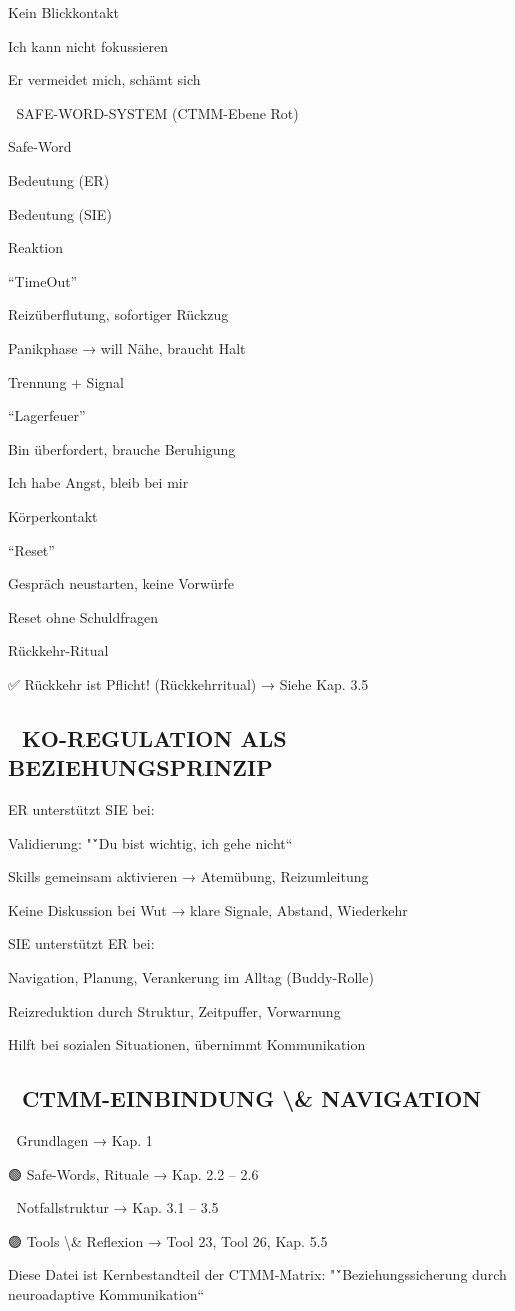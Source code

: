 Kein Blickkontakt

Ich kann nicht fokussieren

Er vermeidet mich, schämt sich

🔑 SAFE-WORD-SYSTEM (CTMM-Ebene Rot)

Safe-Word

Bedeutung (ER)

Bedeutung (SIE)

Reaktion

“TimeOut”

Reizüberflutung, sofortiger Rückzug

Panikphase → will Nähe, braucht Halt

Trennung + Signal

“Lagerfeuer”

Bin überfordert, brauche Beruhigung

Ich habe Angst, bleib bei mir

Körperkontakt

“Reset”

Gespräch neustarten, keine Vorwürfe

Reset ohne Schuldfragen

Rückkehr-Ritual

✅ Rückkehr ist Pflicht! (Rückkehrritual) → Siehe Kap. 3.5

\subsection{🤝 KO-REGULATION ALS BEZIEHUNGSPRINZIP}

ER unterstützt SIE bei:

Validierung:          "\'`Du bist wichtig, ich gehe nicht“

Skills gemeinsam aktivieren → Atemübung, Reizumleitung

Keine Diskussion bei Wut → klare Signale, Abstand, Wiederkehr

SIE unterstützt ER bei:

Navigation, Planung, Verankerung im Alltag (Buddy-Rolle)

Reizreduktion durch Struktur, Zeitpuffer, Vorwarnung

Hilft bei sozialen Situationen, übernimmt Kommunikation

\subsection{🧭 CTMM-EINBINDUNG \textbackslash{}& NAVIGATION}

🔵 Grundlagen → Kap. 1

🟢 Safe-Words, Rituale → Kap. 2.2 -- 2.6

🔴 Notfallstruktur → Kap. 3.1 -- 3.5

🟣 Tools \textbackslash{}& Reflexion → Tool 23, Tool 26, Kap. 5.5

Diese Datei ist Kernbestandteil der CTMM-Matrix: "\'`Beziehungssicherung durch neuroadaptive Kommunikation“
